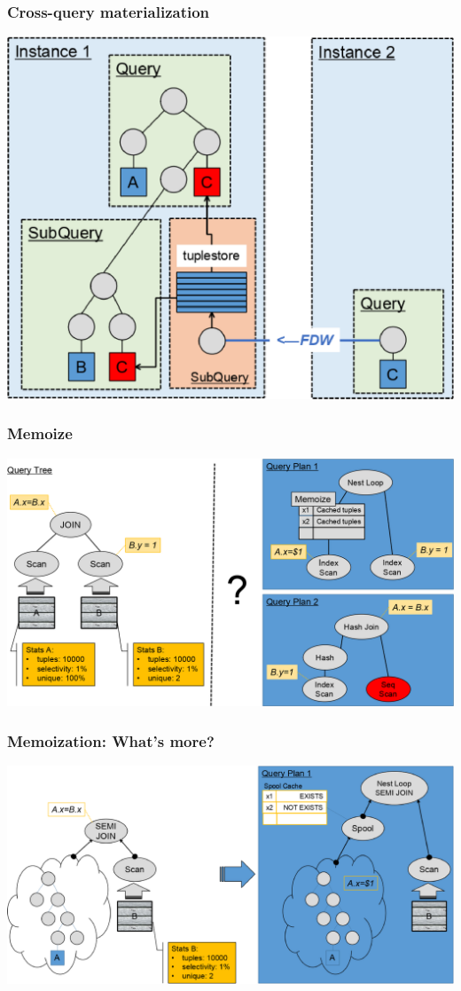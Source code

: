 \documentclass{beamer}
\begin{document}
\begin{frame}\frametitle{Cross-query materialization}
	\includegraphics[scale=0.5]{pics/tee}
\end{frame}

\begin{frame}\frametitle{Memoize}
  \includegraphics[scale=0.32]{pics/memoize}
\end{frame}

\begin{frame}\frametitle{Memoization: What's more?}
\hspace*{\fill}
	\includegraphics[scale=0.35]{pics/spool}
\hspace*{\fill}
\end{frame}
\end{document}
